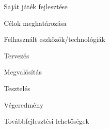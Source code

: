 \begin{MyChapter}{Saját játék fejlesztése}

	\begin{MySection}{Célok meghatározása}
	\end{MySection}
		
	\begin{MySection}{Felhasznált eszközök/technológiák}
	\end{MySection}
		
	\begin{MySection}{Tervezés}
	\end{MySection}
		
	\begin{MySection}{Megvalósítás}
	\end{MySection}
		
	\begin{MySection}{Tesztelés}
	\end{MySection}

	\begin{MySection}{Végeredmény}
	\end{MySection}
	
	\begin{MySection}{Továbbfejlesztési lehetőségek}
	\end{MySection}

\end{MyChapter}